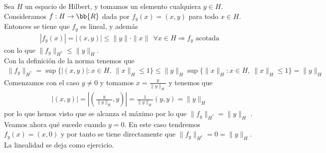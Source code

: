 \begin{ejercicio} %
    Sea $H$ un espacio de Hilbert, y tomamos un elemento cualquiera $y\in H$. Consideramos $f:H\to \bb{R}$ dada por $f_y(x)=(x,y)$ para todo $x\in H$. Entonces se tiene que $f_y$ es lineal, y además
    \begin{gather*}
        |f_y(x)| = |(x,y)| \leq \|y\|\cdot \|x\| \ \ \forall x\in H \Rightarrow f_y \text{ acotada}
    \end{gather*}
    con lo que $\|f_y\|_{H^*}\leq \|y\|_{H}$.\\

    Con la definición de la norma tenemos que 
    \begin{gather*}
        \|f_y\|_{H^*} = \sup\{|(x,y)| : x\in H,\ \|x\|_H\leq 1\} \leq \|y\|_H \sup\{\|x\|_H: x\in H,\ \|x\|_H\leq 1\} = \|y\|_H
    \end{gather*}
    Comenzamos con el caso $y\neq 0$ y tomamos $x=\frac{y}{\|y\|_H}$ y tenemos que
    \begin{gather*}
        |(x,y)| = \left|\left(\frac{y}{\|y\|_H}, y\right)\right| = \frac{1}{\|y\|_H}(y,y) = \|y\|_H
    \end{gather*}
    por lo que hemos visto que se alcanza el máximo por lo que $\|f_y\|_{H^*}=\|y\|_H$ . Veamos ahora qué sucede cuando $y=0$. En este caso tendremos $f_y(x) = (x,0)$ y por tanto se tiene directamente que $\|f_y\|_{H^*}=0=\|y\|_H$.\\

    La linealidad se deja como ejercicio.
\end{ejercicio}

